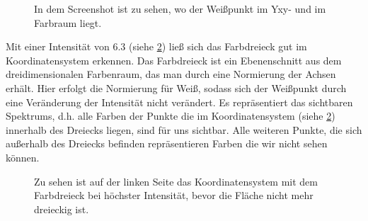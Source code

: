 \documentclass[11pt]{article}
\begin{document}
\begin{figure}[H]
\caption{In dem Screenshot ist zu sehen, wo der Weißpunkt im Yxy- und im Farbraum liegt.}
\label{weisspunkt}
\end{figure}

Mit einer Intensität von $6.3$ (siehe \ref{blau1}) ließ sich das Farbdreieck gut im Koordinatensystem erkennen. Das Farbdreieck ist ein Ebenenschnitt aus dem dreidimensionalen Farbenraum, das man durch eine Normierung der Achsen erhält. Hier erfolgt die Normierung für Weiß, sodass sich der Weißpunkt durch eine Veränderung der Intensität nicht verändert. Es repräsentiert das sichtbaren Spektrums, d.h. alle Farben der Punkte die im Koordinatensystem (siehe \ref{blau1}) innerhalb des Dreiecks liegen, sind für uns sichtbar. Alle weiteren Punkte, die sich außerhalb des Dreiecks befinden repräsentieren Farben die wir nicht sehen können. 

\begin{figure}[H]
\caption{Zu sehen ist auf der linken Seite das Koordinatensystem mit dem Farbdreieck bei höchster Intensität, bevor die Fläche nicht mehr dreieckig ist.}
\label{blau1}
\end{figure}
\end{document}
